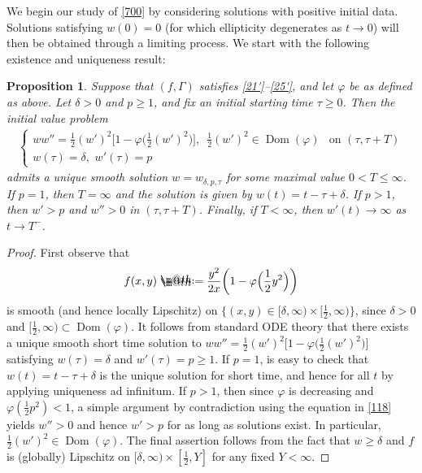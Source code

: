 \documentclass[12pt]{article}
\makeatletter
\numberwithin{equation}{section}
\theoremstyle{plain}
\newtheorem{prop}[thm]{Proposition}
\theoremstyle{definition}
\renewcommand{\phi}{\varphi}
\newcommand*{\defeq}{\mathrel{\rlap{%
			\raisebox{0.3ex}{$\m@th\cdot$}}%
		\raisebox{-0.3ex}{$\m@th\cdot$}}%
	=}
\makeatother
\begin{document}
We begin our study of \eqref{700} by considering solutions with positive initial data.  Solutions satisfying $w(0) = 0$ (for which ellipticity degenerates as $t\rightarrow 0$) will then be obtained through a limiting process. We start with the following existence and uniqueness result:

\begin{prop}\label{p1}
	Suppose that $(f,\Gamma)$ satisfies \eqref{21'}--\eqref{25'}, and let $\phi$ be as defined as above. Let $\delta>0$ and $p \geq 1$, and fix an initial starting time $\tau \geq 0$. Then the initial value problem 
	\begin{align}\label{118}
	\begin{cases}
	ww'' = \frac{1}{2}(w')^2\big[1 - \phi\big(\frac{1}{2}(w')^2\big)\big], \,\,\, \frac{1}{2}(w')^2 \in \operatorname{Dom}(\phi)  & \text{on }(\tau,\tau+T)\\
	w(\tau) = \delta, \,\, w'(\tau) = p
	\end{cases}
	\end{align} 
	admits a unique smooth solution $w=w_{\delta,p,\tau}$ for some maximal value $0<T\leq \infty$. If $p=1$, then $T = \infty$ and the solution is given by $w(t) = t - \tau + \delta$. If $p>1$, then $w'>p$ and $w''>0$ in $(\tau,\tau+T)$. Finally, if $T<\infty$, then $w'(t)\rightarrow\infty$ as $t\rightarrow T^-$. 
\end{prop} 



\begin{proof}
	First observe that 
	\begin{align*}
	f(x,y) \defeq \frac{y^2}{2x}\bigg(1-\phi\Big(\frac{1}{2}y^2\Big)\bigg)
	\end{align*}
	is smooth (and hence locally Lipschitz) on $\{(x,y)\in [\delta ,\infty)\times[\frac{1}{2},\infty)\}$, since $\delta>0$ and $[\frac{1}{2},\infty)\subset\operatorname{Dom}(\phi)$. It follows from standard ODE theory that there exists a unique smooth short time solution to $ww'' = \frac{1}{2}(w')^2\big[1 - \phi\big(\frac{1}{2}(w')^2\big)\big]$ satisfying $w(\tau) = \delta$ and $w'(\tau) = p\geq 1$. If $p=1$, is easy to check that $w(t) = t-\tau + \delta$ is the unique solution for short time, and hence for all $t$ by applying uniqueness ad infinitum. If $p>1$, then since $\phi$ is decreasing and $\phi(\frac{1}{2}p^2)<1$, a simple argument by contradiction using the equation in \eqref{118} yields $w''>0$ and hence $w'>p$ for as long as solutions exist. In particular, $\frac{1}{2}(w')^2\in \operatorname{Dom}(\phi)$. The final assertion follows from the fact that $w \geq \delta$ and $f$ is (globally) Lipschitz on $[\delta,\infty)\times[\frac{1}{2},Y]$ for any fixed $Y<\infty$. 
\end{proof}
\end{document}
